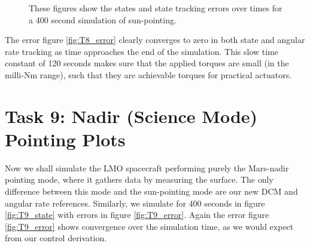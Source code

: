 \documentclass[paper]{aiaaNew}
\begin{document}
\begin{figure}[!htbp] 
\centering     %
{}
\caption{These figures show the states and state tracking errors over times for a 400 second simulation of sun-pointing.}
\end{figure}

The error figure \ref{fig:T8_error} clearly converges to zero in both state and angular rate tracking as time approaches the end of the simulation. This slow time constant of 120 seconds makes sure that the applied torques are small (in the milli-Nm range), such that they are achievable torques for practical actuators.








\section*{Task 9: Nadir (Science Mode) Pointing Plots}
Now we shall simulate the LMO spacecraft performing purely the Mars-nadir pointing mode, where it gathers data by measuring the surface. The only difference between this mode and the sun-pointing mode are our new DCM and angular rate references. Similarly, we simulate for 400 seconds in figure \ref{fig:T9_state} with errors in figure \ref{fig:T9_error}. Again the error figure \ref{fig:T9_error} shows convergence over the simulation time, as we would expect from our control derivation.
\end{document}
